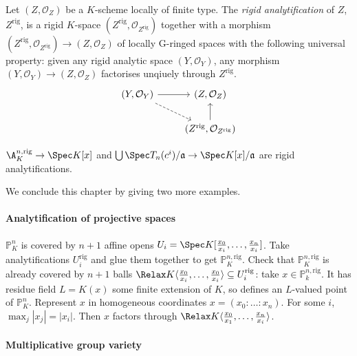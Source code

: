 \documentclass[a4paper]{article}
\renewcommand*{\P}{\mathbb{P}}
\newcommand{\sh}[1]{\mathcal{#1}} %
\renewcommand*{\O}{\mathcal{O}}
\let\Sp\Relax
\DeclareMathOperator{\Sp}{Sp} %
\begin{document}
\begin{definition}
  Let \((Z, \O_Z)\) be a \(K\)-scheme locally of finite type. The \emph{rigid analytification} of \(Z\), \(Z^{\mathrm{rig}}\), is a rigid \(K\)-space \((Z^{\mathrm{rig}}, \sh O_{Z^{\mathrm{rig}}})\) together with a morphism \((Z^{\mathrm{rig}}, \sh O_{Z^{\mathrm{rig}}}) \to (Z, \O_Z)\) of locally G-ringed spaces with the following universal property: given any rigid analytic space \((Y, \sh O_Y)\), any morphism \((Y, \sh O_Y) \to (Z, \sh O_Z)\) factorises unqiuely through \(Z^{\mathrm{rig}}\).
  \[
    \begin{tikzcd}
      (Y, \O_Y) \ar[r] \ar[dr, dashed] & (Z, \sh O_Z) \\
      & (Z^{\mathrm{rig}}, \sh O_{Z^{\mathrm{rig}}}) \ar[u]
    \end{tikzcd}
  \]
\end{definition}

\begin{ex}
  \(\A_K^{n, \mathrm{rig}} \to \Spec K[x]\) and \(\bigcup \Spec T_n(c^i)/\mathfrak a \to \Spec K[x]/\mathfrak a\) are rigid analytifications.
\end{ex}

We conclude this chapter by giving two more examples.

\paragraph{Analytification of projective spaces}

\(\P_K^n\) is covered by \(n + 1\) affine opens \(U_i = \Spec K[\frac{x_0}{x_i}, \dots, \frac{x_n}{x_i}]\). Take analytifications \(U_i^{\mathrm{rig}}\) and glue them together to get \(\P_K^{n, \mathrm{rig}}\). Check that \(\P_K^{n, \mathrm{rig}}\) is already covered by \(n + 1\) balls \(\Sp K \langle \frac{x_0}{x_i}, \dots, \frac{x_0}{x_i} \rangle \subseteq U_i^{\mathrm{rig}}\): take \(x \in \P_k^{n, \mathrm{rig}}\). It has residue field \(L = K(x)\) some finite extension of \(K\), so defines an \(L\)-valued point of \(\P_K^n\). Represent \(x\) in homogeneous coordinates \(x = (x_0: \dots : x_n)\). For some \(i\), \(\max_j{|x_j|} = |x_i|\). Then \(x\) factors through \(\Sp K \langle \frac{x_0}{x_1}, \dots, \frac{x_n}{x_i} \rangle\).

\paragraph{Multiplicative group variety}
\end{document}
